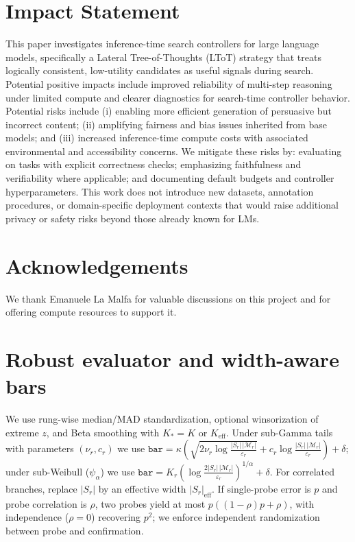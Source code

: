 \documentclass{article}
\begin{document}
\section*{Impact Statement}
This paper investigates inference-time search controllers for large language models,
specifically a Lateral Tree-of-Thoughts (LToT) strategy that treats logically consistent,
low-utility candidates as useful signals during search. Potential positive impacts
include improved reliability of multi-step reasoning under limited compute and clearer
diagnostics for search-time controller behavior. Potential risks include (i) enabling
more efficient generation of persuasive but incorrect content; (ii) amplifying
fairness and bias issues inherited from base models; and (iii) increased inference-time
compute costs with associated environmental and accessibility concerns. We mitigate
these risks by: evaluating on tasks with explicit correctness checks; emphasizing
faithfulness and verifiability where applicable; and documenting default budgets and
controller hyperparameters. This work does not introduce new
datasets, annotation procedures, or domain-specific deployment contexts that would
raise additional privacy or safety risks beyond those already known for LMs.

\section*{Acknowledgements}
We thank Emanuele La Malfa for valuable discussions on this project and for offering compute resources to support it.

\FloatBarrier


\appendix

\section{Robust evaluator and width-aware bars}\label{app:robust-eval}
We use rung-wise median/MAD standardization, optional winsorization of extreme $z$, and Beta smoothing with $K_{*}{=}K$ or $K_{\mathrm{eff}}$.
Under sub-Gamma tails with parameters $(\nu_r,c_r)$ we use
$\texttt{bar}=\kappa(\sqrt{2\nu_r\log \frac{|S_r|\,|\mathcal{M}_r|}{\varepsilon_r}}+c_r\log \frac{|S_r|\,|\mathcal{M}_r|}{\varepsilon_r})+\delta$;
under sub-Weibull ($\psi_\alpha$) we use $\texttt{bar}=K_r(\log \frac{2|S_r|\,|\mathcal{M}_r|}{\varepsilon_r})^{1/\alpha}+\delta$.
For correlated branches, replace $|S_r|$ by an effective width $|S_r|_{\mathrm{eff}}$.
If single-probe error is $p$ and probe correlation is $\rho$, two probes yield at most $p((1-\rho)p+\rho)$,
with independence ($\rho\!=\!0$) recovering $p^2$; we enforce independent randomization between probe and confirmation.
\end{document}
